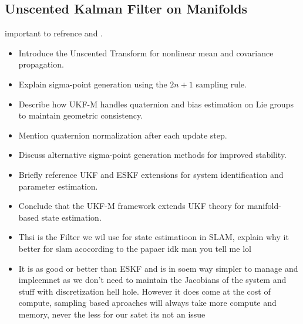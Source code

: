 \subsection{Unscented Kalman Filter on Manifolds}
important to refrence \cite{ukf} and \cite{ukf_manifold}.
\begin{itemize}
    \item Introduce the Unscented Transform for nonlinear mean and covariance propagation.
    \item Explain sigma-point generation using the $2n+1$ sampling rule.
    \item Describe how UKF-M handles quaternion and bias estimation on Lie groups to maintain geometric consistency.
    \item Mention quaternion normalization after each update step.
    \item Discuss alternative sigma-point generation methods for improved stability.
    \item Briefly reference UKF and ESKF extensions for system identification and parameter estimation.
    \item Conclude that the UKF-M framework extends UKF theory for manifold-based state estimation.
    \item Thsi is the Filter we wil use for state estimatioon in SLAM, explain why it better for slam acocording to the papaer idk man you tell me lol
    \item It is as good or better than ESKF and is in soem way simpler to manage and impleemnet as we don't need to maintain the Jacobians of the system and stuff with discretization hell hole. However it does come at the cost of compute, sampling based aproaches will always take more compute and memory, never the less for our satet its not an issue
\end{itemize}

